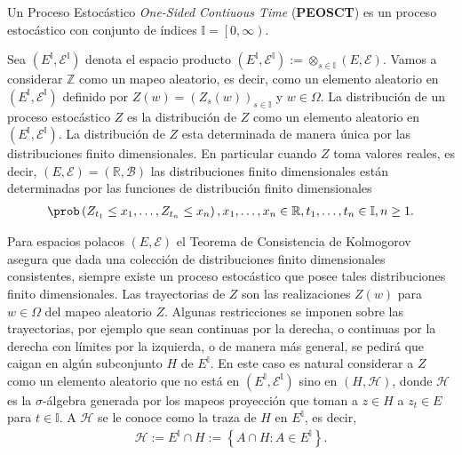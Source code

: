 \begin{Def}
Un Proceso Estoc\'astico \textit{One-Sided Contiuous Time} (\textbf{PEOSCT}) es un proceso estoc\'astico con conjunto de \'indices $\mathbb{I}=\left[0,\infty\right)$.
\end{Def}

Sea $\left(E^{\mathbb{I}},\mathcal{E}^{\mathbb{I}}\right)$ denota el espacio producto $\left(E^{\mathbb{I}},\mathcal{E}^{\mathbb{I}}\right):=\otimes_{s\in\mathbb{I}}\left(E,\mathcal{E}\right)$. Vamos a considerar $\mathbb{Z}$ como un mapeo aleatorio, es decir, como un elemento aleatorio en $\left(E^{\mathbb{I}},\mathcal{E}^{\mathbb{I}}\right)$ definido por $Z\left(w\right)=\left(Z_{s}\left(w\right)\right)_{s\in\mathbb{I}}$ y $w\in\Omega$. La distribuci\'on de un proceso estoc\'astico $Z$ es la distribuci\'on de $Z$ como un elemento aleatorio en $\left(E^{\mathbb{I}},\mathcal{E}^{\mathbb{I}}\right)$. La distribuci\'on de $Z$ esta determinada de manera \'unica por las distribuciones finito dimensionales. En particular cuando $Z$ toma valores reales, es decir, $\left(E,\mathcal{E}\right)=\left(\mathbb{R},\mathcal{B}\right)$ las distribuciones finito dimensionales est\'an determinadas por las funciones de distribuci\'on finito dimensionales
\begin{eqnarray}
\prob\left(Z_{t_{1}}\leq x_{1},\ldots,Z_{t_{n}}\leq x_{n}\right),x_{1},\ldots,x_{n}\in\mathbb{R},t_{1},\ldots,t_{n}\in\mathbb{I},n\geq1.
\end{eqnarray}

Para espacios polacos $\left(E,\mathcal{E}\right)$ el Teorema de Consistencia de Kolmogorov asegura que dada una colecci\'on de distribuciones finito dimensionales consistentes, siempre existe un proceso estoc\'astico que posee tales distribuciones finito dimensionales. Las trayectorias de $Z$ son las realizaciones $Z\left(w\right)$ para $w\in\Omega$ del mapeo aleatorio $Z$. Algunas restricciones se imponen sobre las trayectorias, por ejemplo que sean continuas por la derecha, o continuas por la derecha con l\'imites por la izquierda, o de manera m\'as general, se pedir\'a que caigan en alg\'un subconjunto $H$ de $E^{\mathbb{I}}$. En este caso es natural considerar a $Z$ como un elemento aleatorio que no est\'a en $\left(E^{\mathbb{I}},\mathcal{E}^{\mathbb{I}}\right)$ sino en $\left(H,\mathcal{H}\right)$, donde $\mathcal{H}$ es la $\sigma$-\'algebra generada por los mapeos proyecci\'on que toman a $z\in H$ a $z_{t}\in E$ para $t\in\mathbb{I}$. A $\mathcal{H}$ se le conoce como la traza de $H$ en $E^{\mathbb{I}}$, es decir,
\begin{eqnarray}
\mathcal{H}:=E^{\mathbb{I}}\cap H:=\left\{A\cap H:A\in E^{\mathbb{I}}\right\}.
\end{eqnarray}


